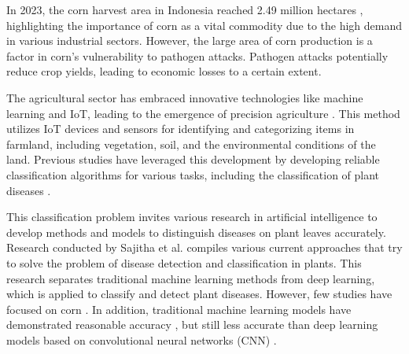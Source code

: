 \documentclass[10pt,a4paper]{article}
\begin{document}
In 2023, the corn harvest area in Indonesia reached 2.49 million hectares \cite{bps}, highlighting the importance of corn as a vital commodity due to the high demand in various industrial sectors. However, the large area of corn production is a factor in corn's vulnerability to pathogen attacks. Pathogen attacks potentially reduce crop yields, leading to economic losses to a certain extent.

The agricultural sector has embraced innovative technologies like machine learning and IoT, leading to the emergence of precision agriculture \cite{Dhanaraju2022, Rehman2022}. This method utilizes IoT devices and sensors for identifying and categorizing items in farmland, including vegetation, soil, and the environmental conditions of the land. Previous studies have leveraged this development by developing reliable classification algorithms for various tasks, including the classification of plant diseases \cite{Ramesh2018,Sajitha2024}.

This classification problem invites various research in artificial intelligence to develop methods and models to distinguish diseases on plant leaves accurately. Research conducted by Sajitha et al. \cite{Sajitha2024} compiles various current approaches that try to solve the problem of disease detection and classification in plants. This research separates traditional machine learning methods from deep learning, which is applied to classify and detect plant diseases. However, few studies have focused on corn \cite{Pardede2018,Aurangzeb2020}. In addition, traditional machine learning models have demonstrated reasonable accuracy \cite{Harakannanavar2022, Wang2020}, but still less accurate than deep learning models based on convolutional neural networks (CNN) \cite{Shoaib2022, Kabir2021, Pandian2022}.
\end{document}
